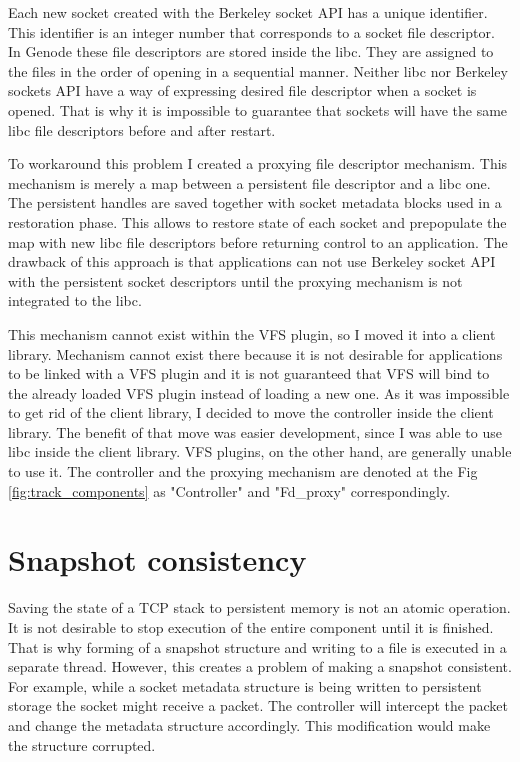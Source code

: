 Each new socket created with the Berkeley socket API has a unique identifier.
This identifier is an integer number that corresponds to a socket file
descriptor. In Genode these file descriptors are stored inside the libc. They
are assigned to the files in the order of opening in a sequential manner.
Neither libc nor Berkeley sockets API have a way of expressing desired file
descriptor when a socket is opened. That is why it is impossible to guarantee
that sockets will have the same libc file descriptors before and after restart.

To workaround this problem I created a proxying file descriptor mechanism. This
mechanism is merely a map between a persistent file descriptor and a libc one.
The persistent handles are saved together with socket metadata blocks used in a
restoration phase. This allows to restore state of each socket and prepopulate
the map with new libc file descriptors before returning control to an
application. The drawback of this approach is that applications can not use
Berkeley socket API with the persistent socket descriptors until the proxying
mechanism is not integrated to the libc. 

This mechanism cannot exist within the VFS plugin, so I moved it into a client
library. Mechanism cannot exist there because it is not desirable for
applications to be linked with a VFS plugin and it is not guaranteed that VFS
will bind to the already loaded VFS plugin instead of loading a new one. As it
was impossible to get rid of the client library, I decided to move the
controller inside the client library. The benefit of that move was easier
development, since I was able to use libc inside the client library. VFS
plugins, on the other hand, are generally unable to use it. The controller and
the proxying mechanism are denoted at the Fig \ref{fig:track_components} as
"Controller" and "Fd\_proxy" correspondingly.

\section{Snapshot consistency}

Saving the state of a TCP stack to persistent memory is not an atomic operation. It
is not desirable to stop execution of the entire component until it is
finished. That is why forming of a snapshot structure and writing to a file is
executed in a separate thread. However, this creates a problem of making a
snapshot consistent. For example, while a socket metadata structure is being
written to persistent storage the socket might receive a packet. The controller
will intercept the packet and change the metadata structure accordingly. This
modification would make the structure corrupted. 

